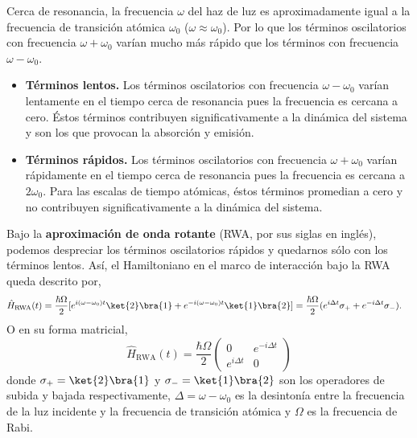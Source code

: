 Cerca de resonancia, la frecuencia $\omega$ del haz de luz es aproximadamente igual a la frecuencia de transición atómica $\omega_0$ ($\omega \approx \omega_0$). Por lo que los términos oscilatorios con frecuencia $\omega + \omega_0$ varían mucho más rápido que los términos con frecuencia $\omega - \omega_0$.

\begin{itemize}
    \item \textbf{Términos lentos.} Los términos oscilatorios con frecuencia $\omega - \omega_0$ varían lentamente en el tiempo cerca de resonancia pues la frecuencia es cercana a cero. Éstos términos contribuyen significativamente a la dinámica del sistema y son los que provocan la absorción y emisión.
    \item \textbf{Términos rápidos.} Los términos oscilatorios con frecuencia $\omega + \omega_0$ varían rápidamente en el tiempo cerca de resonancia pues la frecuencia es cercana a $2 \omega_0$. Para las escalas de tiempo atómicas, éstos términos promedian a cero y no contribuyen significativamente a la dinámica del sistema.
\end{itemize}

Bajo la \textbf{aproximación de onda rotante} (RWA, por sus siglas en inglés), podemos despreciar los términos oscilatorios rápidos y quedarnos sólo con los términos lentos. Así, el Hamiltoniano en el marco de interacción bajo la RWA queda descrito por,
\begin{equation}
\begin{split}
    \hat{H}_{\text{RWA}} (t) &= \frac{\hbar \Omega}{2}[e^{i(\omega - \omega_0) t} \ket{2}\bra{1} + e^{-i(\omega - \omega_0) t} \ket{1}\bra{2}]
    = \frac{\hbar \Omega}{2}(e^{i \Delta t} \sigma_+ + e^{-i \Delta t}\sigma_-).
\end{split}
\end{equation}
O en su forma matricial,
\begin{equation}
    \boxed{\hat{H}_{\text{RWA}} (t) = \frac{\hbar \Omega}{2}\begin{pmatrix}
    0 & e^{-i \Delta t} \\
    e^{i \Delta t} & 0
    \end{pmatrix}}
\end{equation}
donde $\sigma_+ = \ket{2}\bra{1}$ y $\sigma_- = \ket{1}\bra{2}$ son los operadores de subida y bajada respectivamente, $\Delta = \omega - \omega_0$ es la desintonía entre la frecuencia de la luz incidente y la frecuencia de transición atómica y $\Omega$ es la frecuencia de Rabi.

